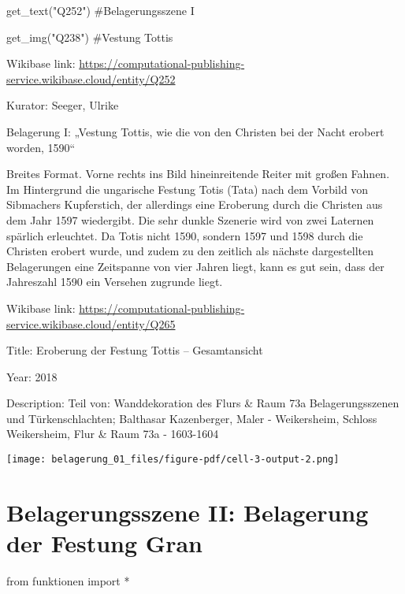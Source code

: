 \documentclass[
  a4paper,
  portrait]{book}
\newenvironment{Shaded}{\begin{snugshade}}{\end{snugshade}}
\newcommand{\CommentTok}[1]{\textcolor[rgb]{0.37,0.37,0.37}{#1}}
\newcommand{\ImportTok}[1]{\textcolor[rgb]{0.00,0.46,0.62}{#1}}
\newcommand{\NormalTok}[1]{\textcolor[rgb]{0.00,0.23,0.31}{#1}}
\newcommand{\OperatorTok}[1]{\textcolor[rgb]{0.37,0.37,0.37}{#1}}
\newcommand{\StringTok}[1]{\textcolor[rgb]{0.13,0.47,0.30}{#1}}
\begin{document}
\begin{Shaded}
\begin{Highlighting}[]
\NormalTok{get\_text(}\StringTok{"Q252"}\NormalTok{)}
\CommentTok{\#Belagerungsszene I}

\NormalTok{get\_img(}\StringTok{"Q238"}\NormalTok{)}
\CommentTok{\#Vestung Tottis}
\end{Highlighting}
\end{Shaded}

Wikibase link:
\url{https://computational-publishing-service.wikibase.cloud/entity/Q252}

Kurator: Seeger, Ulrike

Belagerung I: „Vestung Tottis, wie die von den Christen bei der Nacht
erobert worden, 1590``

Breites Format. Vorne rechts ins Bild hineinreitende Reiter mit großen
Fahnen. Im Hintergrund die ungarische Festung Totis (Tata) nach dem
Vorbild von Sibmachers Kupferstich, der allerdings eine Eroberung durch
die Christen aus dem Jahr 1597 wiedergibt. Die sehr dunkle Szenerie wird
von zwei Laternen spärlich erleuchtet. Da Totis nicht 1590, sondern 1597
und 1598 durch die Christen erobert wurde, und zudem zu den zeitlich als
nächste dargestellten Belagerungen eine Zeitspanne von vier Jahren
liegt, kann es gut sein, dass der Jahreszahl 1590 ein Versehen zugrunde
liegt.

Wikibase link:
\url{https://computational-publishing-service.wikibase.cloud/entity/Q265}

Title: Eroberung der Festung Tottis -- Gesamtansicht

Year: 2018

Description: Teil von: Wanddekoration des Flurs \& Raum 73a
Belagerungsszenen und Türkenschlachten; Balthasar Kazenberger, Maler -
Weikersheim, Schloss Weikersheim, Flur \& Raum 73a - 1603-1604

\texttt{[image: belagerung\_01\_files/figure-pdf/cell-3-output-2.png]}

\chapter{Belagerungsszene II: Belagerung der Festung
Gran}\label{belagerungsszene-ii-belagerung-der-festung-gran}

\begin{Shaded}
\begin{Highlighting}[]
\ImportTok{from}\NormalTok{ funktionen }\ImportTok{import} \OperatorTok{*}
\end{Highlighting}
\end{Shaded}
\end{document}
